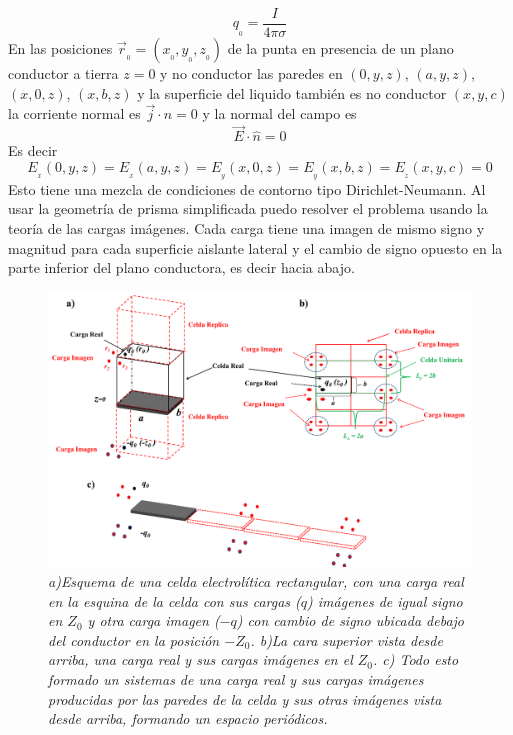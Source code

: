 \documentclass[a4paper,11pt,]{book}
\begin{document}
\begin{equation}
q_{_{0}} = \dfrac{I}{4 \pi \sigma} 	
\end{equation}
En las posiciones $\vec{r}_{_{0}}=(x_{_{0}}, y_{_{0}}, z_{_{0}})$ de la punta en presencia de un plano conductor a tierra $z=0$  y no conductor las paredes en  $(0, y ,z)$, $(a, y ,z)$, $(x, 0 ,z)$, $(x, b ,z)$ y la superficie del liquido también es no conductor  $(x, y ,c)$ la corriente normal es $\vec{j} \cdot \hat{n}=0$ y la normal del campo es
\begin{equation}
\vec{E} \cdot \hat{n}=0 	
\end{equation}
Es decir
\begin{equation}
E_{_{x}}(0, y ,z)= E_{_{x}}(a, y ,z)=E_{{_y}}(x, 0 ,z)=E_{{_y}}(x, b ,z)=E_{{_z}}(x, y ,c)=0
\end{equation}
 Esto tiene una mezcla de condiciones de contorno  tipo Dirichlet-Neumann. Al usar la geometría de prisma simplificada puedo resolver el problema usando la teoría de las cargas imágenes. Cada carga tiene una imagen de mismo signo y magnitud para cada superficie aislante lateral  y el cambio  de signo opuesto en la parte inferior del plano conductora, es decir hacia abajo. 
\begin{figure}[H]
	\centering
	\includegraphics[scale=.42]{../Images/Cellgrin}
	\caption{\emph{a)Esquema de una celda electrolítica rectangular, con una carga real en la esquina de la celda con sus cargas ($q$) imágenes de  igual signo en $Z_0$ y otra carga imagen ($-q$) con cambio de signo  ubicada debajo del  conductor en la posición $-Z_0$. b)La cara superior vista desde arriba, una carga real y sus cargas imágenes  en el $Z_0$. c) Todo esto formado un  sistemas de una carga real y sus  cargas imágenes producidas por las paredes de la celda y sus otras imágenes  vista desde arriba, formando un espacio periódicos. }}
	\label{fig:T1}
\end{figure}
\end{document}
